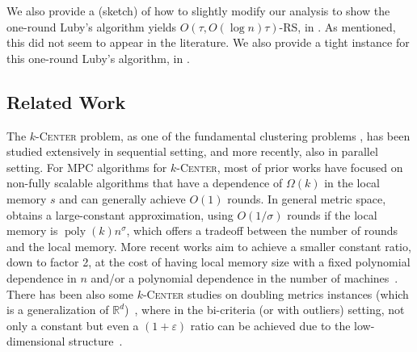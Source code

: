 \documentclass[11pt,letterpaper]{article}
\theoremstyle{plain}
\theoremstyle{definition}
\theoremstyle{remark}
\newcommand{\ProblemName}[1]{\textsc{#1}}
\newcommand{\kCenter}{$k$-\ProblemName{Center}\xspace}
\DeclareMathOperator{\poly}{poly}
\renewcommand{\epsilon}{\ensuremath{\varepsilon}}
\let\epsilon\varepsilon
\begin{document}
We also provide a (sketch) of how to slightly modify our analysis to show the one-round Luby's algorithm yields $O(\tau, O(\log n)\tau)$-RS, in . As mentioned, this did not seem to appear in the literature.
We also provide a tight instance for this one-round Luby's algorithm, in .

























     \subsection{Related Work}

The \kCenter problem, as one of the fundamental clustering problems \cite{Gonzalez85,HS85,DBLP:journals/jacm/HochbaumS86}, has been studied extensively in sequential setting, and more recently, also in parallel setting. For MPC algorithms for \kCenter, most of prior works have focused on non-fully scalable algorithms that have a dependence of $\Omega(k)$ in the local memory $s$ and can generally achieve $O(1)$ rounds. 
In general metric space,~\cite{EneIM11} obtains a large-constant approximation,
using $O(1 / \sigma)$ rounds if the local memory is $\poly(k)n^\sigma$,
which offers a tradeoff between the number of rounds and the local memory.
More recent works aim to achieve a smaller constant ratio, down to factor 2, at the cost of having local memory size with a fixed polynomial dependence in $n$ and/or a polynomial dependence in the number of machines~\cite{MalkomesKCWM15,ImM15,HZ23,AG23}.
There has been also some \kCenter studies on doubling metrics instances (which is a generalization of $\mathbb{R}^d$)~\cite{CeccarelloPP19,BBM23}, where in the bi-criteria (or with outliers) setting, 
not only a constant but even a $(1+\epsilon)$ ratio can be achieved due to the low-dimensional structure~\cite{BBM23}.
\end{document}
